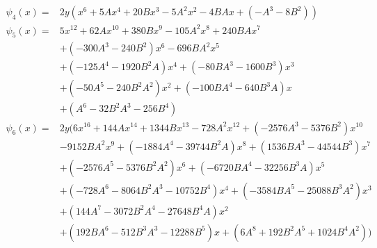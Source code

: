 \documentclass[10pt,handout]{beamer}%
\theoremstyle{definition}
\begin{document}
\begin{frame}
\begin{example}
 \begin{scriptsize}
 \begin{align*}
\psi_4(x)=&2y(x^6
 + 5 A x^4
 + 20 B x^3
 - 5 A^2 x^2
 - 4 B A x
 + \left(-A^3
 - 8 B^2\right))\\
 \psi_5(x)=&5 x^{12}
 + 62 A x^{10}
 + 380 B x^9
 - 105 A^2 x^8
 + 240 B A x^7\\&
 + \left(-300 A^3
 - 240 B^2\right)  x^6
 - 696 B A^2 x^5\\&
 + \left(-125 A^4
 - 1920 B^2 A\right)  x^4
 + \left(-80 B A^3
 - 1600 B^3\right)  x^3\\&
 + \left(-50 A^5
 - 240 B^2 A^2\right)  x^2
 + \left(-100 B A^4
 - 640 B^3 A\right)  x\\&
 + \left(A^6
 - 32 B^2 A^3
 - 256 B^4\right)\\
 \psi_6(x)=&2y(
 6 x^{16}
 + 144 A x^{14}
 + 1344 B x^{13}
 - 728 A^2 x^{12}
 + \left(-2576 A^3
 - 5376 B^2\right)  x^{10}\\ &
 - 9152 B A^2 x^9
 + \left(-1884 A^4
 - 39744 B^2 A\right)  x^8
 + \left(1536 B A^3
 - 44544 B^3\right)  x^7\\&
 + \left(-2576 A^5
 - 5376 B^2 A^2\right)  x^6
 + \left(-6720 B A^4
 - 32256 B^3 A\right)  x^5\\&
 + \left(-728 A^6
 - 8064 B^2 A^3
 - 10752 B^4\right)  x^4
 + \left(-3584 B A^5
 - 25088 B^3 A^2\right)  x^3\\&
 + \left(144 A^7
 - 3072 B^2 A^4
 - 27648 B^4 A\right)  x^2\\&
 + \left(192 B A^6
 - 512 B^3 A^3
 - 12288 B^5\right)  x
 + \left(6 A^8
 + 192 B^2 A^5
 + 1024 B^4 A^2\right))
  \end{align*}
 \end{scriptsize}\vspace*{-7mm}
\end{example}

\end{frame}
\end{document}
